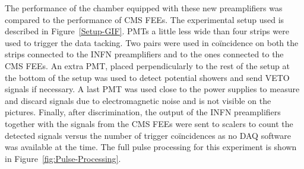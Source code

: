 	The performance of the chamber equipped with these new preamplifiers was compared to the performance of CMS FEEs. The experimental setup used is described in Figure~\ref{Setup-GIF}. PMTs a little less wide than four strips were used to trigger the data tacking. Two pairs were used in coïncidence on both the strips connected to the INFN preamplifiers and to the ones connected to the CMS FEEs. An extra PMT, placed perpendicularly to the rest of the setup at the bottom of the setup was used to detect potential showers and send VETO signals if necessary. A last PMT was used close to the power supplies to measure and discard signals due to electromagnetic noise and is not visible on the pictures. Finally, after discrimination, the output of the INFN preamplifiers together with the signals from the CMS FEEs were sent to scalers to count the detected signals versus the number of trigger coïncidences as no DAQ software was available at the time. The full pulse processing for this experiment is shown in Figure~\ref{fig:Pulse-Processing}.
	 
